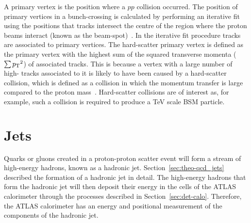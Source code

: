 A primary vertex is the position where a $pp$ collision occurred.
The position of primary vertices in a bunch-crossing is calculated by performing
an iterative fit using the positions that tracks intersect the centre of the region where the proton beams interact (known as the beam-spot)~\cite{obj-tracks_pv}.
In the iterative fit procedure tracks are associated to primary vertices.
The hard-scatter primary vertex is defined as the primary vertex with the highest sum of the squared transverse momenta ($\sum {\ensuremath{p_{\mathrm{T}}}}^2$) of associated tracks.
This is because a vertex with a large number of high-\pT{} tracks associated to it is likely to have been caused by a
hard-scatter collision, which is defined as a collision in which the momentum transfer is large compared to the proton mass~\cite{trig-hard_scatter}.
Hard-scatter collisions are of interest as, for example, such a collision is required to produce a TeV scale BSM particle.

\vspace{-0.5em}
\section{Jets}
\label{sec:obj-jets}

Quarks or gluons created in a proton-proton scatter event
will form a stream of high-energy hadrons, known as a hadronic jet.
Section~\ref{sec:theo-qcd_jets} described the formation of a hadronic jet in detail.
The high-energy hadrons that form the hadronic jet will then deposit their energy in the cells of the ATLAS calorimeter
through the processes described in Section~\ref{sec:det-calo}.
Therefore, the ATLAS calorimeter has an energy and positional measurement of the components of the hadronic jet.



